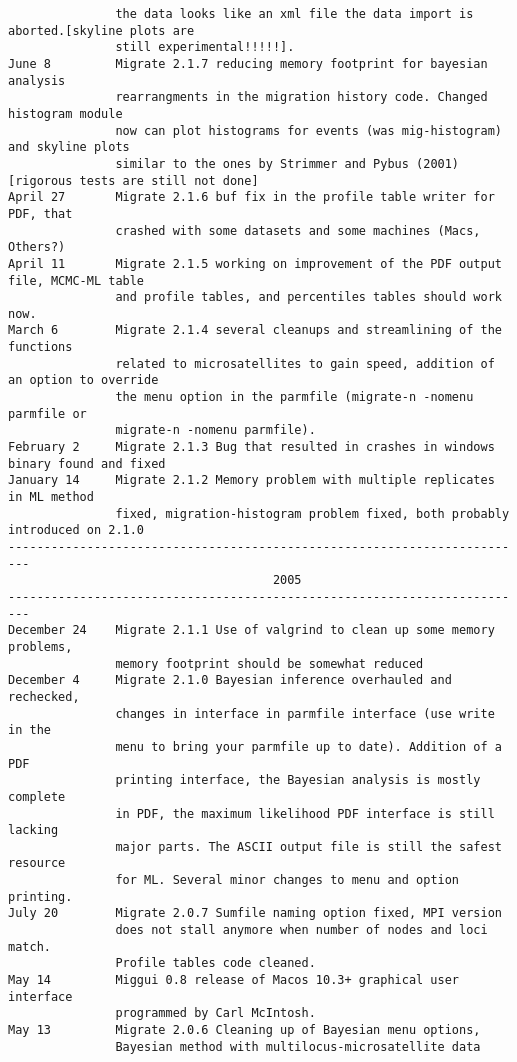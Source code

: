 \begin{small}
\begin{verbatim}
               the data looks like an xml file the data import is aborted.[skyline plots are
               still experimental!!!!!].
June 8         Migrate 2.1.7 reducing memory footprint for bayesian analysis
               rearrangments in the migration history code. Changed histogram module
               now can plot histograms for events (was mig-histogram) and skyline plots
               similar to the ones by Strimmer and Pybus (2001)[rigorous tests are still not done]
April 27       Migrate 2.1.6 buf fix in the profile table writer for PDF, that
               crashed with some datasets and some machines (Macs, Others?)
April 11       Migrate 2.1.5 working on improvement of the PDF output file, MCMC-ML table 
               and profile tables, and percentiles tables should work now.
March 6        Migrate 2.1.4 several cleanups and streamlining of the functions
               related to microsatellites to gain speed, addition of an option to override 
               the menu option in the parmfile (migrate-n -nomenu parmfile or
               migrate-n -nomenu parmfile). 
February 2     Migrate 2.1.3 Bug that resulted in crashes in windows binary found and fixed
January 14     Migrate 2.1.2 Memory problem with multiple replicates in ML method
               fixed, migration-histogram problem fixed, both probably introduced on 2.1.0
-------------------------------------------------------------------------
                                     2005
-------------------------------------------------------------------------
December 24    Migrate 2.1.1 Use of valgrind to clean up some memory problems,
               memory footprint should be somewhat reduced
December 4     Migrate 2.1.0 Bayesian inference overhauled and rechecked,
               changes in interface in parmfile interface (use write in the
               menu to bring your parmfile up to date). Addition of a PDF
               printing interface, the Bayesian analysis is mostly complete
               in PDF, the maximum likelihood PDF interface is still lacking
               major parts. The ASCII output file is still the safest resource 
               for ML. Several minor changes to menu and option printing.
July 20        Migrate 2.0.7 Sumfile naming option fixed, MPI version 
               does not stall anymore when number of nodes and loci match.
               Profile tables code cleaned.
May 14         Miggui 0.8 release of Macos 10.3+ graphical user interface
               programmed by Carl McIntosh.
May 13         Migrate 2.0.6 Cleaning up of Bayesian menu options, 
               Bayesian method with multilocus-microsatellite data

\end{verbatim}
\end{small}
